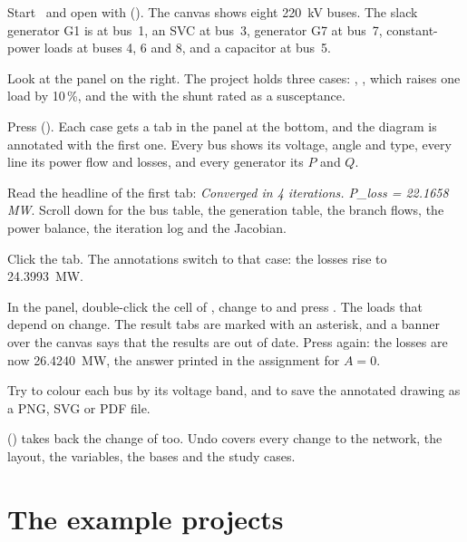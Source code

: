 \begin{steps}
  \item Start \app\ and open  with 
    (). The canvas shows eight 220~kV buses. The slack generator G1 is at
    bus~1, an SVC at bus~3, generator G7 at bus~7, constant-power loads at buses 4, 6 and
    8, and a capacitor at bus~5.
  \item Look at the  panel on the right. The project holds three cases:
    , , which raises one load by 10\,\%, and the
     with the shunt rated as a susceptance.
  \item Press  (). Each case gets a tab in the
     panel at the bottom, and the diagram is annotated with the first one.
    Every bus shows its voltage, angle and type, every line its power flow and losses,
    and every generator its $P$ and $Q$.
  \item Read the headline of the first tab: \emph{Converged in 4 iterations. P\_loss =
    22.1658 MW}. Scroll down for the bus table, the generation table, the branch flows,
    the power balance, the iteration log and the Jacobian.
  \item Click the  tab. The annotations switch to that case: the losses rise to
    24.3993~MW.
  \item In the  panel, double-click the  cell of ,
    change  to  and press . The loads that depend on  change. The result
    tabs are marked with an asterisk, and a banner over the canvas says that the results
    are out of date. Press  again: the losses are now 26.4240~MW, the answer
    printed in the assignment for $A=0$.
  \item Try  to colour each bus by its voltage
    band, and  to save the annotated drawing as a PNG, SVG
    or PDF file.
\end{steps}

\begin{tip}
 () takes back the change of  too. Undo covers
every change to the network, the layout, the variables, the bases and the study cases.
\end{tip}

\section{The example projects}

